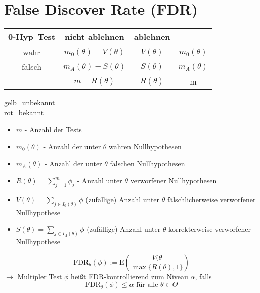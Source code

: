 \section{False Discover Rate (FDR) }
\begin{minipage} [t] {0.6\textwidth}
\begin{tabular}{c|c|c|c}
0-Hyp\ Test & nicht ablehnen & ablehnen & \\ \hline
wahr & \cellcolor{yellow!25} $m_0 (\theta) - V(\theta)$ & \cellcolor{yellow!25}$V(\theta)$ & \cellcolor{yellow!25}$m_0(\theta)$\\ \hline
falsch &\cellcolor{yellow!25}$m_A (\theta) - S(\theta)$  &\cellcolor{yellow!25} $S(\theta)$ &\cellcolor{yellow!25} $m_A(\theta)$\\ \hline
& \cellcolor{red!25}$m-R(\theta)$ & \cellcolor{red!25}$R(\theta)$ & m\\
\end{tabular}
\end{minipage}
\begin{minipage} [t] {0.3\textwidth}
gelb=unbekannt\\ rot=bekannt
\end{minipage}

\begin{itemize}
 \item $m$ - Anzahl der Tests \\
 \item $m_0 (\theta)$ - Anzahl der unter $\theta$ wahren Nullhypothesen \\
 \item $m_A (\theta)$ - Anzahl der unter $\theta$ falschen Nullhypothesen \\
 \item $R(\theta) = \sum\limits_{j=1}^m \phi_j$ - Anzahl unter $\theta$ verworfener Nullhypothesen
 \item $V(\theta) = \sum\limits_{j \in I_0(\theta)} \phi $ (zufällige) Anzahl unter $\theta$ fälschlicherweise verworfener Nullhypothese 
 \item $S(\theta) = \sum\limits_{j \in I_A(\theta)} \phi $ (zufällige) Anzahl unter $\theta$ korrekterweise verworfener Nullhypothese 
\end{itemize}

\[ \text{FDR}_{\theta}(\phi) := \text{E} \left( \frac{V(\theta}{\max\{R(\theta),1\}}\right) \]
$\rightarrow$ Multipler Test $\phi$ heißt \underline{FDR-kontrollierend zum Niveau $\alpha$}, falls
\[ \text{FDR}_{\theta}(\phi) \leq \alpha \text{ für alle } \theta \in \Theta \]

